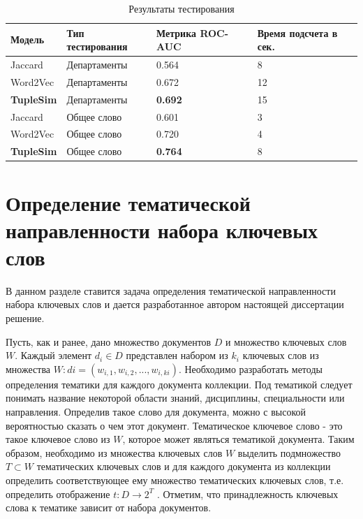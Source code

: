 \begin{table}
\begin{tabularx}{16cm}{|X|X|X|X|} 
        \hline
        Модель & Тип тестирования & Метрика ROC-AUC &  Время подсчета в сек. \\ \hline
        Jaccard & Департаменты &0.564 & 8 \\ \hline
        Word2Vec & Департаменты &0.672 & 12 \\ \hline
        \textbf{TupleSim} & Департаменты & \textbf{0.692} & 15 \\ \hline
        Jaccard & Общее слово & 0.601 & 3 \\ \hline
        Word2Vec & Общее слово & 0.720 & 4 \\ \hline
        \textbf{TupleSim} & Общее слово& \textbf{0.764} & 8 \\ \hline
\end{tabularx}

\caption{Результаты тестирования} \label{tbl:tuple_test}
\end{table}




\section{Определение тематической направленности набора ключевых слов} \label{theme_tags}
В данном разделе ставится задача определения тематической направленности набора ключевых слов и дается разработанное автором настоящей диссертации решение.

Пусть, как и ранее, дано множество документов $D$ и множество ключевых слов $W$. Каждый элемент $d_i \in D$ представлен набором из $k_i$ ключевых слов из множества $W: di = (w_{i,1},w_{i,2},...,w_{i,ki})$. Необходимо разработать методы определения тематики для каждого документа коллекции. Под тематикой следует понимать название некоторой области знаний, дисциплины, специальности или направления. Определив такое слово для документа, можно с высокой вероятностью сказать о чем этот документ. Тематическое ключевое слово - это такое ключевое слово из $W$, которое может являться тематикой документа. Таким образом, необходимо из множества ключевых слов $W$ выделить подмножество $T \subset W$ тематических ключевых слов и для каждого документа из коллекции определить соответствующее ему множество тематических ключевых слов, т.е. определить отображение $t : D \rightarrow 2^T$ . Отметим, что принадлежность ключевых слова к тематике зависит от набора документов.

